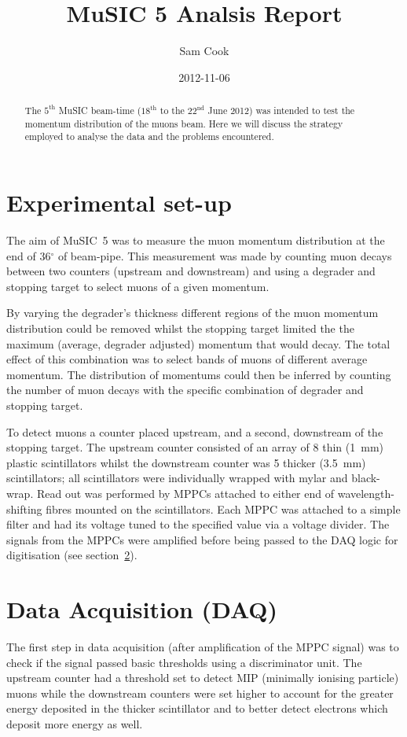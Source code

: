\documentclass[]{article}
\title{MuSIC 5 Analsis Report}
\author{Sam Cook}
\date{2012-11-06}
\newcommand{\nth}[1]{$#1^\text{th}$}
\newcommand{\nthTwo}[2]{$#1^\text{#2}$}
\begin{document}
\ifpdf
{}
\else
{}
\fi

\maketitle


\begin{abstract}
	The \nth{5} MuSIC beam-time (\nth{18} to the \nthTwo{22}{nd} June 2012) was intended to test the momentum distribution of the muons beam. Here we will discuss the strategy employed to analyse the data and the problems encountered.
\end{abstract}

\section{Experimental set-up}\label{sec:set-up}
The aim of MuSIC~5 was to measure the muon momentum distribution at the end of 36\(^{\circ}\) of beam-pipe. This measurement was made by counting muon decays between two counters (upstream and downstream) and using a degrader and stopping target to select muons of a given momentum. 

By varying the degrader's thickness different regions of the muon momentum distribution could be removed whilst the stopping target limited the the maximum (average, degrader adjusted) momentum that would decay. The total effect of this combination was to select bands of muons of different average momentum. The distribution of momentums could then be inferred by counting the number of muon decays with the specific combination of degrader and stopping target. 

To detect muons a counter placed upstream, and a second, downstream of the stopping target. The upstream counter consisted of an array of 8 thin (1~mm) plastic scintillators whilst the downstream counter was 5 thicker (3.5~mm) scintillators; all scintillators were individually wrapped with mylar and black-wrap. Read out was performed by MPPCs attached to either end of wavelength-shifting fibres mounted on the scintillators. Each MPPC was attached to a simple filter and had its voltage tuned to the specified value via a voltage divider. The signals from the MPPCs were amplified before being passed to the DAQ logic for digitisation (see section~\ref{sec:daq}).

\section{Data Acquisition (DAQ)}\label{sec:daq}
The first step in data acquisition (after amplification of the MPPC signal) was to check if the signal passed basic thresholds using a discriminator unit. The upstream counter had a threshold set to detect MIP (minimally ionising particle) muons while the downstream counters were set higher to account for the greater energy deposited in the thicker scintillator and to better detect electrons which deposit more energy as well. 
\end{document}
